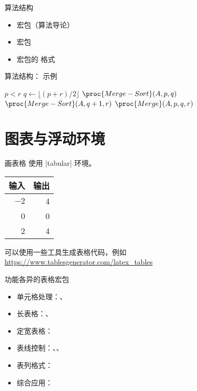 \begin{frame}{算法结构}
\begin{itemize}
\item {} 宏包（算法导论）
\item {} 宏包
\item {} 宏包的  格式
\end{itemize}
\end{frame}

\begin{frame}[fragile,shrink=10]{算法结构： 示例}
\begin{vdemocode}
\begin{codebox}
\li \If $p<r$
\li \Then $q \gets \lfloor(p+r)/2\rfloor$
\li   $\proc{Merge-Sort}(A,p,q)$
\li   $\proc{Merge-Sort}(A,q+1,r)$
\li   $\proc{Merge}(A,p,q,r)$
    \End
\end{codebox}
\end{vdemocode}
\end{frame}

\section{图表与浮动环境}

\begin{frame}[fragile]{画表格}
使用 |tabular| 环境。
\begin{democode}
\begin{tabular}{|rr|}
\hline
输入& 输出\\ \hline
$-2$ & 4 \\
0 & 0 \\
2 & 4 \\ \hline
\end{tabular}
\end{democode}

可以使用一些工具生成表格代码，例如\\
\url{https://www.tablesgenerator.com/latex_tables}
\end{frame}

\begin{frame}{功能各异的表格宏包}
\begin{itemize}
\item 单元格处理：、
\item 长表格：、
\item 定宽表格：
\item 表线控制：、、
\item 表列格式：
\item 综合应用：
\end{itemize}
\end{frame}

